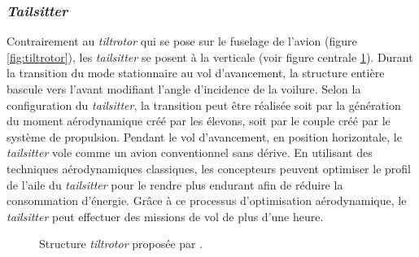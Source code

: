         \subsubsection*{\textit{Tailsitter}}
        Contrairement au \textit{tiltrotor} qui se pose sur le fuselage de l'avion (figure \ref{fig:tiltrotor}), les \textit{tailsitter} se posent à la verticale (voir figure centrale \ref{fig:tailsitter}). Durant la transition du mode stationnaire au vol d'avancement, la structure entière bascule vers l'avant modifiant l'angle d'incidence de la voilure. Selon la configuration du \textit{tailsitter}, la transition peut être réalisée soit par la génération du moment aérodynamique créé par les élevons, soit par le couple créé par le système de propulsion. Pendant le vol d'avancement, en position horizontale, le \textit{tailsitter} vole comme un avion conventionnel sans dérive. En utilisant des techniques aérodynamiques classiques, les concepteurs peuvent optimiser le profil de l'aile du \textit{tailsitter} pour le rendre plus endurant afin de réduire la consommation d'énergie. Grâce à ce processus d'optimisation aérodynamique, le \textit{tailsitter} peut effectuer des missions de vol de plus d'une heure.

        \begin{figure}[ht!]
            \centering
            \caption{Structure \textit{tiltrotor}  proposée par \cite{smeurINDITail,fernandez:hal-04612206,pflimlin:tel-00132352}.}
            \label{fig:tailsitter}
        \end{figure}
        
